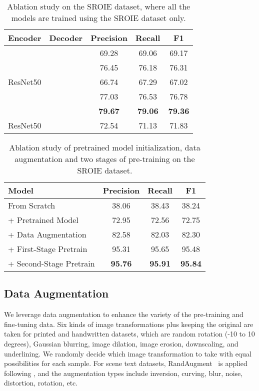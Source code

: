 \documentclass[letterpaper]{article} \usepackage{aaai23}  \usepackage{times}  \usepackage{helvet}  \usepackage{courier}  \usepackage[hyphens]{url}  \usepackage{graphicx} \urlstyle{rm} \def\UrlFont{\rm}  \usepackage{natbib}  \usepackage{caption} \frenchspacing  \setlength{\pdfpagewidth}{8.5in} \setlength{\pdfpageheight}{11in} \usepackage{algorithm}
\begin{document}
\begin{table}[ht]
\centering
\small
\begin{tabular}{ccccc}
\hline
\textbf{Encoder} & \textbf{Decoder}  & \textbf{Precision} & \textbf{Recall} & \textbf{F1}    \\
\hline
             &   & 69.28              & 69.06           & 69.17          \\
             &   & 76.45              & 76.18           & 76.31          \\
ResNet50         &   & 66.74              & 67.29           & 67.02          \\
             &  & 77.03              & 76.53           & 76.78          \\
             &  & \textbf{79.67}     & \textbf{79.06}  & \textbf{79.36} \\
ResNet50         &  & 72.54              & 71.13           & 71.83          \\
\hline
\end{tabular}
\caption{Ablation study on the SROIE dataset, where all the models are trained using the SROIE dataset only.}
\label{tab:ablation}
\end{table}

\begin{table}
\centering
\begin{tabular}{lccc}
\hline
\textbf{Model}          & \textbf{Precision} & \textbf{Recall} & \textbf{F1}    \\ \hline
From Scratch            & 38.06              & 38.43           & 38.24          \\
+ Pretrained Model      & 72.95              & 72.56           & 72.75          \\
+ Data Augmentation     & 82.58              & 82.03           & 82.30          \\
+ First-Stage Pretrain  & 95.31              & 95.65           & 95.48          \\
+ Second-Stage Pretrain & \textbf{95.76}     & \textbf{95.91}  & \textbf{95.84} \\ \hline
\end{tabular}
\caption{Ablation study of pretrained model initialization, data augmentation and two stages of pre-training on the SROIE dataset.}
\label{tab:ablation2}
\end{table}

\subsection{Data Augmentation}
We leverage data augmentation to enhance the variety of the pre-training and fine-tuning data. Six kinds of image transformations plus keeping the original are taken for printed and handwritten datasets, which are random rotation (-10 to 10 degrees), Gaussian blurring, image dilation, image erosion, downscaling, and underlining. We randomly decide which image transformation to take with equal possibilities for each sample. For scene text datasets, RandAugment~\cite{cubuk2020randaugment} is applied following \cite{atienza2021vision}, and the augmentation types include inversion, curving, blur, noise, distortion, rotation, etc.
\end{document}
